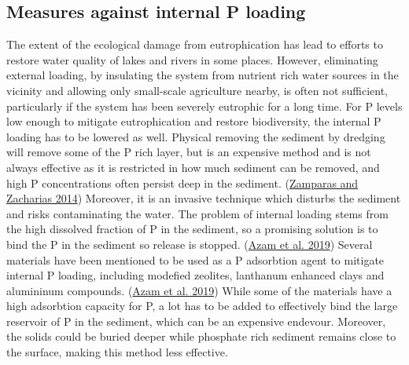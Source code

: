 \documentclass[a4paper,11pt]{article}
\begin{document}
\hypertarget{measures-against-internal-p-loading}{%
\subsection{Measures against internal P loading}\label{measures-against-internal-p-loading}}

The extent of the ecological damage from eutrophication has lead to efforts to restore water quality of lakes and rivers in some places. However, eliminating external loading, by insulating the system from nutrient rich water sources in the vicinity and allowing only small-scale agriculture nearby, is often not sufficient, particularly if the system has been severely eutrophic for a long time. For P levels low enough to mitigate eutrophication and restore biodiversity, the internal P loading has to be lowered as well. Physical removing the sediment by dredging will remove some of the P rich layer, but is an expensive method and is not always effective as it is restricted in how much sediment can be removed, and high P concentrations often persist deep in the sediment. (\protect\hyperlink{ref-zamparasRestorationEutrophicFreshwater2014}{Zamparas and Zacharias 2014}) Moreover, it is an invasive technique which disturbs the sediment and risks contaminating the water. The problem of internal loading stems from the high dissolved fraction of P in the sediment, so a promising solution is to bind the P in the sediment so release is stopped. (\protect\hyperlink{ref-azamPhosphorousEnvironmentCharacteristics2019}{Azam et al. 2019}) Several materials have been mentioned to be used as a P adsorbtion agent to mitigate internal P loading, including modefied zeolites, lanthanum enhanced clays and alumininum compounds. (\protect\hyperlink{ref-azamPhosphorousEnvironmentCharacteristics2019}{Azam et al. 2019}) While some of the materials have a high adsorbtion capacity for P, a lot has to be added to effectively bind the large reservoir of P in the sediment, which can be an expensive endevour. Moreover, the solids could be buried deeper while phosphate rich sediment remains close to the surface, making this method less effective.
\end{document}
